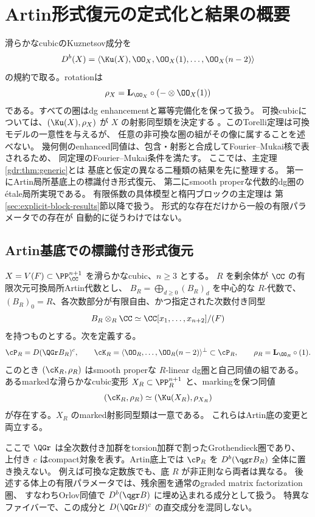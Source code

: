 \section{Artin形式復元の定式化と結果の概要}\label{sec:intro}

滑らかなcubicのKuznetsov成分を
\[
 D^b(X)=\langle\Ku(X),\OO_X,\OO_X(1),\ldots,\OO_X(n-2)\rangle
\]
の規約で取る。rotationは
\[
 \rho_X=\mathbf L_{\OO_X}\circ(-\otimes\OO_X(1))
\]
である。すべての圏はdg enhancementと冪等完備化を保って扱う。
可換cubicについては、\((\Ku(X),\rho_X)\) が \(X\) の射影同型類を決定する
\cite[Theorem 1.7]{LZ}。このTorelli定理は可換モデルの一意性を与えるが、
任意の非可換な圏の組がその像に属することを述べない。
幾何側のenhanced同値は、包含・射影と合成してFourier--Mukai核で表されるため、
同定理のFourier--Mukai条件を満たす。
ここでは、主定理\ref{gdr:thm:generic}とは
基底と仮定の異なる二種類の結果を先に整理する。
第一にArtin局所基底上の標識付き形式復元、
第二にsmooth properな代数的dg圏のétale局所実現である。
有限係数の具体模型と楕円ブロックの主定理は
第\ref{sec:explicit-block-results}節以降で扱う。
形式的な存在だけから一般の有限パラメータでの存在が
自動的に従うわけではない。

\subsection{Artin基底での標識付き形式復元}

\begin{theorem}[次数付き変形の形式的可換モデル]\label{thm:main}
 \(X=V(F)\subset\PP^{n+1}_{\CC}\) を滑らかなcubic、\(n\ge3\) とする。
 \(R\) を剰余体が \(\CC\) の有限次元可換局所Artin代数とし、
 \(B_R=\bigoplus_{d\ge0}(B_R)_d\) を中心的な \(R\)-代数で、
 \((B_R)_0=R\)、各次数部分が有限自由、かつ指定された次数付き同型
 \[
 B_R\otimes_R\CC\simeq\CC[x_1,\ldots,x_{n+2}]/(F)
 \]
 を持つものとする。次を定義する。
 \[
 \cP_R=D(\QGr B_R)^c,\qquad
 \cK_R=\langle\OO_R,\ldots,\OO_R(n-2)\rangle^\perp\subset\cP_R,\qquad
 \rho_R=\mathbf L_{\OO_R}\circ(1).
 \]
 このとき \((\cK_R,\rho_R)\) はsmooth properな \(R\)-linear dg圏と自己同値の組である。
 あるmarkedな滑らかなcubic変形
 \(X_R\subset\PP^{n+1}_R\) と、markingを保つ同値
 \[
 (\cK_R,\rho_R)\simeq(\Ku(X_R),\rho_{X_R})
 \]
 が存在する。\(X_R\) のmarked射影同型類は一意である。
 これらはArtin底の変更と両立する。
\end{theorem}

ここで \(\QGr\) は全次数付き加群をtorsion加群で割ったGrothendieck圏であり、
上付き \(c\) はcompact対象を表す。Artin底上では
\(\cP_R\) を \(D^b(\qgr B_R)\) 全体に置き換えない。
例えば可換な定数族でも、底 \(R\) が非正則なら両者は異なる。
後述する体上の有限パラメータでは、残余圏を通常のgraded matrix factorization圏、
すなわちOrlov同値で \(D^b(\qgr B)\) に埋め込まれる成分として扱う。
特異なファイバーで、この成分と \(D(\QGr B)^c\) の直交成分を混同しない。

